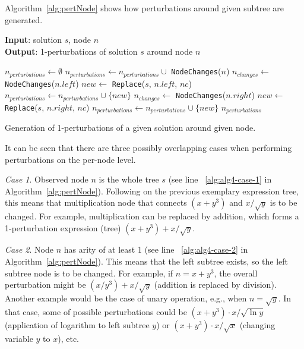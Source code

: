 \documentclass{bmcart}
\begin{document}
Algorithm~\ref{alg:pertNode} shows how perturbations around given subtree are generated.

\begin{algorithm}	
	\hspace*{\algorithmicindent} \textbf{Input}: solution $s$, node $n$\\
	\hspace*{\algorithmicindent} \textbf{Output}: 1-perturbations of solution $s$ around node $n$
	\begin{algorithmic}[1]
		\State $n_{perturbations} \gets \emptyset$
		 \label{alg:alg4-case-1}
		\State $n_{perturbations} \gets n_{perturbations} \cup$ \texttt{NodeChanges}($n$)
		\EndIf
		\label{alg:alg4-case-2}
		\State $n_{changes} \gets$ \texttt{NodeChanges}($n.left$)
		\State $new \gets$ \texttt{Replace}($s$, $n.left$, $nc$)
		\State $n_{perturbations} \gets n_{perturbations} \cup \{new\}$
		\EndFor
		\EndIf
		\label{alg:alg4-case-3}
		\State $n_{changes} \gets$ \texttt{NodeChanges}($n.right$)
		\State $new \gets$ \texttt{Replace}($s$, $n.right$, $nc$)
		\State $n_{perturbations} \gets n_{perturbations} \cup \{new\}$
		\EndFor
		\EndIf
		\State \Return $n_{perturbations}$
		\EndProcedure
	\end{algorithmic}
	\caption{Generation of 1-perturbations of a given solution around given node.}
	\label{alg:pertNode}
\end{algorithm}

It can be seen that there are three possibly overlapping cases when performing perturbations on the per-node level. 

\emph{Case 1}. 
Observed node $n$ is the whole tree $s$ (see line ~\ref{alg:alg4-case-1} in Algorithm~\ref{alg:pertNode}). Following on  the previous exemplary expression tree, this means that multiplication node that connects $(x+y^3)$ and $x/\sqrt{y}$ is to be changed. For example, multiplication can be replaced by addition, which forms a 1-perturbation expression (tree) $(x+y^3)+ x/\sqrt{y}$. 


\emph{Case 2}. 
Node $n$ has arity of at least 1 (see line ~\ref{alg:alg4-case-2} in Algorithm~\ref{alg:pertNode}). This means that the left subtree exists, so the left subtree node is to be changed. 
For example, if $n=x+y^3$, the overall perturbation might be $(x/y^3)+x/\sqrt{y}$ (addition is replaced by division). 
Another example would be the case of unary operation, e.g., when $n=\sqrt{y}$. In that case, some of possible perturbations could be $(x+y^3)\cdot x/\sqrt{\ln{y}}$ (application of logarithm to left subtree $y$) or $(x+y^3)\cdot x/\sqrt{x}$ (changing variable $y$ to $x$), etc.
\end{document}

